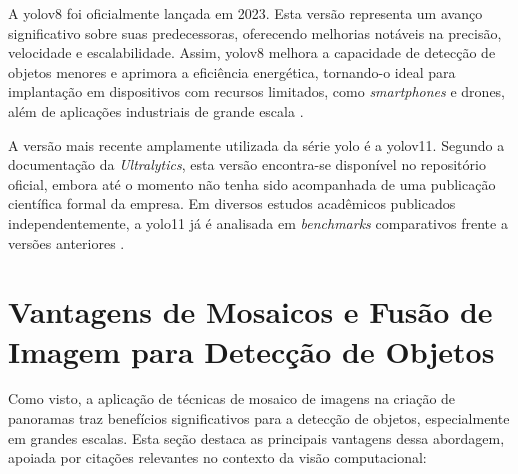 A \gls{yolo}v8 foi oficialmente lançada em 2023. Esta versão representa um avanço significativo sobre suas predecessoras, oferecendo melhorias notáveis na precisão, velocidade e escalabilidade. Assim, \gls{yolo}v8 melhora a capacidade de detecção de objetos menores e aprimora a eficiência energética, tornando-o ideal para implantação em dispositivos com recursos limitados, como \textit{smartphones} e drones, além de aplicações industriais de grande escala \cite{Jocher2023YOLOv8}.

A versão mais recente amplamente utilizada da série \gls{yolo} é a \gls{yolo}v11. Segundo a documentação da \textit{Ultralytics}, esta versão encontra-se disponível no repositório oficial, embora até o momento não tenha sido acompanhada de uma publicação científica formal da empresa. Em diversos estudos acadêmicos publicados independentemente, a \gls{yolo}11 já é analisada em \textit{benchmarks} comparativos frente a versões anteriores \cite{Jegham2024YOLO11, Sapkota2025YOLO11}.



\section{Vantagens de Mosaicos e Fusão de Imagem para Detecção de Objetos}

Como visto, a aplicação de técnicas de mosaico de imagens na criação de panoramas traz benefícios significativos para a detecção de objetos, especialmente em grandes escalas. Esta seção destaca as principais vantagens dessa abordagem, apoiada por citações relevantes no contexto da visão computacional:

